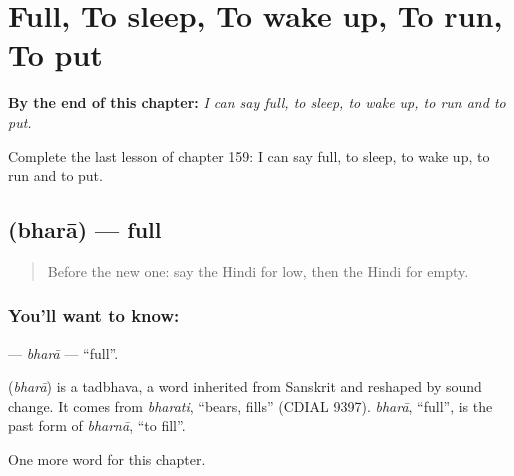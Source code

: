 
\chapter{Full, To sleep, To wake up, To run, To put}
\label{ch:hi-full-to-sleep-to-wake-up-to-run-to-put}

\begin{chapteropening}
\textbf{By the end of this chapter:} \emph{I can say full, to sleep, to wake up, to run and to put.}

Complete the last lesson of chapter 159: I can say full, to sleep, to wake up, to run and to put.
\end{chapteropening}

\section[\texorpdfstring{\hi{भरा} (bharā)}{भरा (bharā)}]{ (bharā) — full}

\label{lesson:HI-C159-bhara}



\begin{quote}
Before the new one: say the Hindi for low, then the Hindi for empty.
\end{quote}

\subsection*{You'll want to know: }
\textbf{} — \emph{bharā} — \textquotedblleft{}full\textquotedblright{}.

\begin{cousinweb}
\textbf{} (\emph{bharā}) is a tadbhava, a word inherited from Sanskrit and reshaped by sound change. It comes from \emph{bharati}, \textquotedblleft{}bears, fills\textquotedblright{} (CDIAL 9397). \emph{bharā}, \textquotedblleft{}full\textquotedblright{}, is the past form of \emph{bharnā}, \textquotedblleft{}to fill\textquotedblright{}.
\end{cousinweb}

\begin{grammarlens}[title={What you've built}]
One more word for this chapter.
\end{grammarlens}

